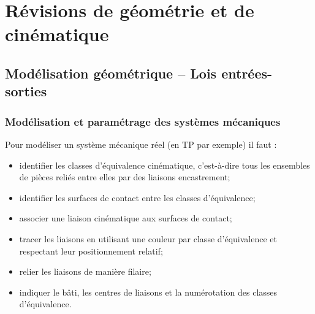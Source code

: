 \setchapterpreamble[u]{\margintoc}

\chapter{Révisions de géométrie et de cinématique}

\section{Modélisation géométrique -- Lois entrées-sorties}

\marginnote[8cm]{
}

% 
% 
\subsection{Modélisation et paramétrage des systèmes mécaniques}
\begin{methode}

Pour modéliser un système mécanique réel (en TP par exemple) il faut : 
\begin{itemize}
\item identifier les classes d'équivalence cinématique, c'est-à-dire tous les ensembles de pièces reliés entre elles par des liaisons encastrement;
\item identifier les surfaces de contact entre les classes d'équivalence;
\item associer une liaison cinématique aux surfaces de contact;
\item tracer les liaisons en utilisant une couleur par classe d'équivalence et respectant leur positionnement relatif;
\item relier les liaisons de manière filaire;
\item indiquer le bâti, les centres de liaisons et la numérotation des classes d'équivalence.
\end{itemize}
\end{methode}


